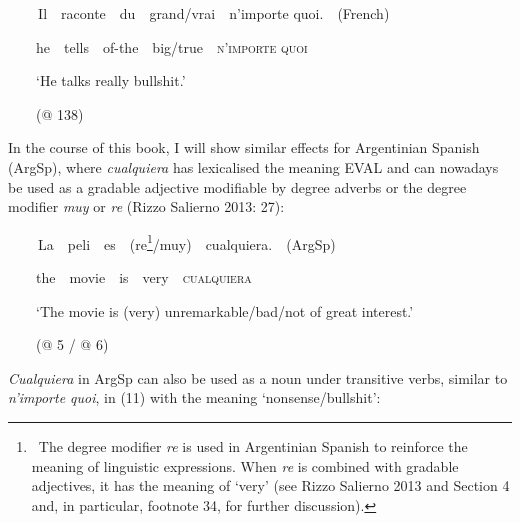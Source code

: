 \clearpage\begin{styleStandard}
\textbf{\ \ }\ \ Il\ \ raconte\ \ du\ \ grand/vrai\ \ n’importe quoi.\ \ (French)
\end{styleStandard}

\begin{styleStandard}
\ \ \ \ he\ \ tells\ \ of-the\ \ big/true\ \ \textsc{n’importe quoi \ \ }
\end{styleStandard}

\begin{styleStandard}
\ \ \ \ ‘He talks really bullshit.’\ \ 
\end{styleStandard}

\begin{styleStandard}
\ \ \ \ (@ 138)
\end{styleStandard}

\begin{styleStandard}
In the course of this book, I will show similar effects for Argentinian Spanish (ArgSp), where \textit{cualquiera} has lexicalised the meaning EVAL and can nowadays be used as a gradable adjective modifiable by degree adverbs or the degree modifier \textit{muy} or \textit{re} (Rizzo Salierno 2013: 27):
\end{styleStandard}

\clearpage\begin{styleStandard}
\textbf{\ \ }\ \ La\ \ peli\ \ es\ \ (re\footnote{\textrm{\ The degree modifier }\textrm{\textit{re}}\textrm{ is used in Argentinian Spanish to reinforce the meaning of linguistic expressions. When }\textrm{\textit{re}}\textrm{ is combined with gradable adjectives, it has the meaning of ‘very’ (see Rizzo Salierno 2013 and Section 4 and, in particular, footnote 34, for further discussion).}}/muy)\ \ cualquiera.\ \ (ArgSp)
\end{styleStandard}

\begin{styleStandard}
\ \ \ \ the\ \ movie\ \ is\ \ very\ \ \textsc{cualquiera} \ \ 
\end{styleStandard}

\begin{styleStandard}
\ \ \ \ ‘The movie is (very) unremarkable/bad/not of great interest.’
\end{styleStandard}

\begin{styleStandard}
\ \ \ \ (@ 5 / @ 6)
\end{styleStandard}

\begin{styleStandard}
\textit{Cualquiera} in ArgSp can also be used as a noun under transitive verbs, similar to \textit{n’importe quoi}, in (11) with the meaning ‘nonsense/bullshit’:
\end{styleStandard}

